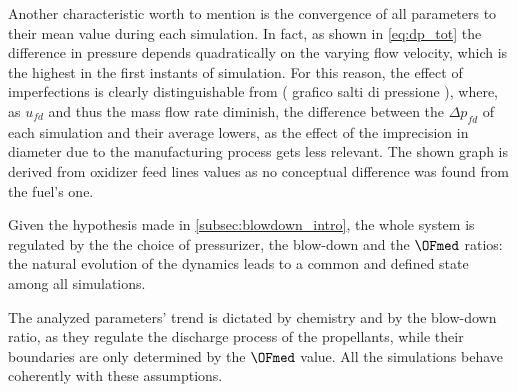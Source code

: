 
Another characteristic worth to mention is the convergence of all parameters to their mean value during each simulation.
In fact, as shown in \autoref{eq:dp_tot} the difference in pressure depends quadratically on the varying flow velocity, which is the highest in the first instants of simulation.
For this reason, the effect of imperfections is clearly distinguishable from ( grafico salti di pressione ), where, as $u_{fd}$ and thus the mass flow rate diminish, the difference between the $\Delta p_{fd}$ of each simulation and their average lowers, as the effect of the imprecision in diameter due to the manufacturing process gets less relevant. The shown graph is derived from oxidizer feed lines values as no conceptual difference was found from the fuel's one. 

Given the hypothesis made in \autoref{subsec:blowdown_intro}, the whole system is regulated by the the choice of pressurizer, the blow-down and the $\OFmed$ ratios: the natural evolution of the dynamics leads to a common and defined state among all simulations.

The analyzed parameters' trend is dictated by chemistry and by the blow-down ratio, as they regulate the discharge process of the propellants, while their boundaries are only determined by the $\OFmed$ value. All the simulations behave coherently  with these assumptions. 












